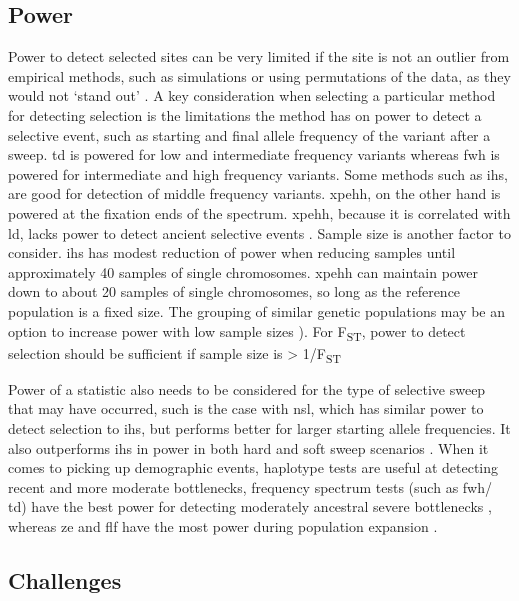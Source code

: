 \documentclass[]{report}
\begin{document}
\subsection{Power}\label{power}

Power to detect selected sites can be very limited if the site is not an
outlier from empirical methods, such as simulations or using
permutations of the data, as they would not `stand out'
\citep{Teshima2006}. A key consideration when selecting a particular
method for detecting selection is the limitations the method has on
power to detect a selective event, such as starting and final allele
frequency of the variant after a sweep. \Gls{td} is powered for low and
intermediate frequency variants \citep{Simonsen1995} whereas \gls{fwh}
is powered for intermediate and high frequency variants. Some methods
such as \gls{ihs}, are good for detection of middle frequency variants.
\Gls{xpehh}, on the other hand is powered at the fixation ends of the
spectrum. \Gls{xpehh}, because it is correlated with \gls{ld}, lacks
power to detect ancient selective events \citep{Chen2010}. Sample size
is another factor to consider. \Gls{ihs} has modest reduction of power
when reducing samples until approximately 40 samples of single
chromosomes. \Gls{xpehh} can maintain power down to about 20 samples of
single chromosomes, so long as the reference population is a fixed size.
The grouping of similar genetic populations may be an option to increase
power with low sample sizes \citep{pickrell2009signals}). For
F\textsubscript{ST}, power to detect selection should be sufficient if
sample size is \textgreater{} 1/F\textsubscript{ST}
\citep{Bhatia2013a, Bhatia2011}

Power of a statistic also needs to be considered for the type of
selective sweep that may have occurred, such is the case with \gls{nsl},
which has similar power to detect selection to \gls{ihs}, but performs
better for larger starting allele frequencies. It also outperforms
\gls{ihs} in power in both hard and soft sweep scenarios
\citep{Ferrer-Admetlla2014}. When it comes to picking up demographic
events, haplotype tests are useful at detecting recent and more moderate
bottlenecks, frequency spectrum tests (such as \gls{fwh}/ \gls{td}) have
the best power for detecting moderately ancestral severe bottlenecks
\citep{Depaulis2003}, whereas \gls{ze} and \gls{flf} have the most power
during population expansion \citep{Zeng2006, Ramirez-Soriano2008}.

\subsection{Challenges}\label{challenges}
\end{document}
